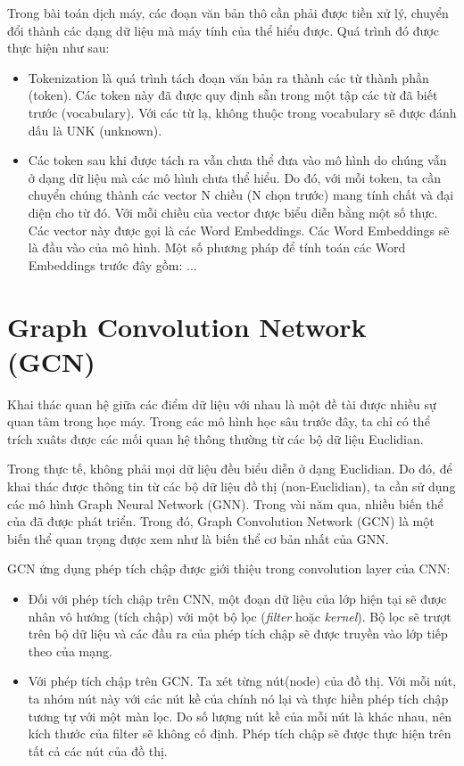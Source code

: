 Trong bài toán dịch máy, các đoạn văn bản thô cần phải được tiền xử lý, chuyển đổi thành các dạng dữ liệu mà máy tính của thể hiểu được. Quá trình đó được thực hiện như sau:
\begin{itemize}
	\item Tokenization là quá trình tách đoạn văn bản ra thành các từ thành phần (token). Các token này đã được quy định sẵn trong một tập các từ đã biết trước (vocabulary). Với các từ lạ, không thuộc trong vocabulary sẽ được đánh dấu là UNK (unknown).
	\item Các token sau khi được tách ra vẫn chưa thể đưa vào mô hình do chúng vẫn ở dạng dữ liệu mà các mô hình chưa thể hiểu. Do đó, với mỗi token, ta cần chuyển chúng thành các vector N chiều (N chọn trước) mang tính chất và đại diện cho từ đó. Với mỗi chiều của vector được biểu diễn bằng một số thực. Các vector này được gọi là các Word Embeddings. Các Word Embeddings sẽ là đầu vào của mô hình. Một số phương pháp để tính toán các Word Embeddings trước đây gồm: ...
\end{itemize}

\section{Graph Convolution Network (GCN)}
Khai thác quan hệ giữa các điểm dữ liệu với nhau là một đề tài được nhiều sự quan tâm trong học máy. Trong các mô hình học sâu trước đây, ta chỉ có thể trích xuâts được các mối quan hệ thông thường từ các bộ dữ liệu Euclidian. 

Trong thực tế, không phải mọi dữ liệu đều biểu diễn ở dạng Euclidian. Do đó, để khai thác được thông tin từ các bộ dữ liệu đồ thị (non-Euclidian), ta cần sử dụng các mô hình Graph Neural Network (GNN). Trong vài năm qua, nhiều biến thể của đã được phát triển. Trong đó, Graph Convolution Network (GCN) là một biến thể quan trọng được xem như là biến thể cơ bản nhất của GNN.

GCN ứng dụng phép tích chập được giới thiệu trong convolution layer của CNN:
\begin{itemize}
	\item Đối với phép tích chập trên CNN, một đoạn dữ liệu của lớp hiện tại sẽ được nhân vô hướng (tích chập) với một bộ lọc (\textit{filter} hoặc \textit{kernel}). Bộ lọc sẽ trượt trên bộ dữ liệu và các đầu ra của phép tích chập sẽ được truyền vào lớp tiếp theo của mạng.
	\item Với phép tích chập trên GCN. Ta xét từng nút(node) của đồ thị. Với mỗi nút, ta nhóm nút này với các nút kề của chính nó lại và thực hiền phép tích chập tương tự với một màn lọc. Do số lượng nút kề của mỗi nút là khác nhau, nên kích thước của filter sẽ không cố định. Phép tích chập sẽ được thực hiện trên tất cả các nút của đồ thị.
\end{itemize}

